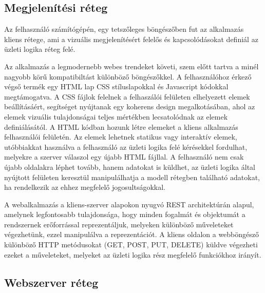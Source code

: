\subsection{Megjelenítési réteg}\label{sect:kliens_reteg}

Az felhasználó számítógépén, egy tetszőleges böngészőben fut az alkalmazás kliens rétege, ami a vizuális megjelenítésért felelős és kapcsolódásokat definiál az üzleti logika réteg felé.

Az alkalmazás a legmodernebb webes trendeket követi, szem előtt tartva a minél nagyobb körű kompatibiltást különböző böngészőkkel. A felhasználóhoz érkező végső termék egy HTML lap CSS stíluslapokkal és Javascript kódokkal megtámogatva. 
A CSS fájlok felelnek a felhaszálói felületen elhelyezett elemek beállításáért, segítséget nyújtanak egy koherens design megalkotásában, ahol az elemek vizuális tulajdonságai teljes mértékben lecsatolódnak az elemek definiálásától.
A HTML kódban hozunk létre elemeket a kliens alkalmazás felhasználói felületén. Az elemek lehetnek statikus vagy interaktív elemek, utóbbiakkat használva a felhasználó az üzleti logika felé kérésekkel fordulhat, melyekre a szerver válaszol egy újabb HTML fájllal. A felhasználó nem csak újabb oldalakra léphet tovább, hanem adatokat is küldhet, az üzleti logika által nyújtott felületen keresztül manipulálhatja a modell rétegben található adatokat, ha rendelkezik az ehhez megfelelő jogosultságokkal.

\bigskip

A webalkalmazás a kliens-szerver alapokon nyugvó REST architektúrán alapul, amelynek legfontosabb tulajdonsága, hogy minden fogalmát és objektumát a rendszernek erőforrással reprezentáljuk, melyeken különböző műveleteket végezhetünk, ezzel manipulálva a reprezentációt. A kliens oldalon a webböngésző különböző HTTP metódusokat (GET, POST, PUT, DELETE) küldve végezheti ezeket a műveleteket, melyeket az üzleti logika rész megfelelő funkciókhoz irányít.

\subsection{Webszerver réteg}\label{sect:szerver_reteg}

